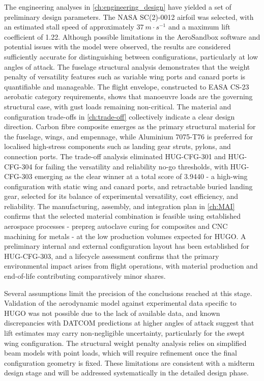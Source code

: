 The engineering analyses in \autoref{ch:engineering_design} have yielded a set of preliminary design parameters. The NASA SC(2)-0012 airfoil was selected, with an estimated stall speed of approximately $37 \ m \cdot s^{-1}$ and a maximum lift coefficient of 1.22. Although possible limitations in the AeroSandbox software and potential issues with the model were observed, the results are considered sufficiently accurate for distinguishing between configurations, particularly at low angles of attack. The fuselage structural analysis demonstrates that the weight penalty of versatility features such as variable wing ports and canard ports is quantifiable and manageable. The flight envelope, constructed to EASA CS-23 aerobatic category requirements, shows that manoeuvre loads are the governing structural case, with gust loads remaining non-critical. The material and configuration trade-offs in \autoref{ch:trade-off} collectively indicate a clear design direction. Carbon fibre composite emerges as the primary structural material for the fuselage, wings, and empennage, while Aluminium 7075-T76 is preferred for localised high-stress components such as landing gear struts, pylons, and connection ports. The trade-off analysis eliminated HUG-CFG-301 and HUG-CFG-304 for failing the versatility and reliability no-go thresholds, with HUG-CFG-303 emerging as the clear winner at a total score of 3.9440 - a high-wing configuration with static wing and canard ports, and retractable buried landing gear, selected for its balance of experimental versatility, cost efficiency, and reliability. The manufacturing, assembly, and integration plan in \autoref{ch:MAI} confirms that the selected material combination is feasible using established aerospace processes - prepreg autoclave curing for composites and CNC machining for metals - at the low production volumes expected for HUGO. A preliminary internal and external configuration layout has been established for HUG-CFG-303, and a lifecycle assessment confirms that the primary environmental impact arises from flight operations, with material production and end-of-life contributing comparatively minor shares.

Several assumptions limit the precision of the conclusions reached at this stage. Validation of the aerodynamic model against experimental data specific to HUGO was not possible due to the lack of available data, and known discrepancies with DATCOM predictions at higher angles of attack suggest that lift estimates may carry non-negligible uncertainty, particularly for the swept wing configuration. The structural weight penalty analysis relies on simplified beam models with point loads, which will require refinement once the final configuration geometry is fixed. These limitations are consistent with a midterm design stage and will be addressed systematically in the detailed design phase.

